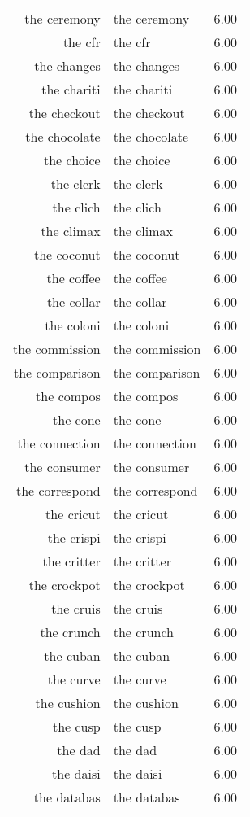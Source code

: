 \begin{table}[ht]
\begin{tabular}{rlr}
  the ceremony & the ceremony & 6.00 \\ 
  the cfr & the cfr & 6.00 \\ 
  the changes & the changes & 6.00 \\ 
  the chariti & the chariti & 6.00 \\ 
  the checkout & the checkout & 6.00 \\ 
  the chocolate & the chocolate & 6.00 \\ 
  the choice & the choice & 6.00 \\ 
  the clerk & the clerk & 6.00 \\ 
  the clich & the clich & 6.00 \\ 
  the climax & the climax & 6.00 \\ 
  the coconut & the coconut & 6.00 \\ 
  the coffee & the coffee & 6.00 \\ 
  the collar & the collar & 6.00 \\ 
  the coloni & the coloni & 6.00 \\ 
  the commission & the commission & 6.00 \\ 
  the comparison & the comparison & 6.00 \\ 
  the compos & the compos & 6.00 \\ 
  the cone & the cone & 6.00 \\ 
  the connection & the connection & 6.00 \\ 
  the consumer & the consumer & 6.00 \\ 
  the correspond & the correspond & 6.00 \\ 
  the cricut & the cricut & 6.00 \\ 
  the crispi & the crispi & 6.00 \\ 
  the critter & the critter & 6.00 \\ 
  the crockpot & the crockpot & 6.00 \\ 
  the cruis & the cruis & 6.00 \\ 
  the crunch & the crunch & 6.00 \\ 
  the cuban & the cuban & 6.00 \\ 
  the curve & the curve & 6.00 \\ 
  the cushion & the cushion & 6.00 \\ 
  the cusp & the cusp & 6.00 \\ 
  the dad & the dad & 6.00 \\ 
  the daisi & the daisi & 6.00 \\ 
  the databas & the databas & 6.00 \\ 

\end{tabular}
\end{table}
